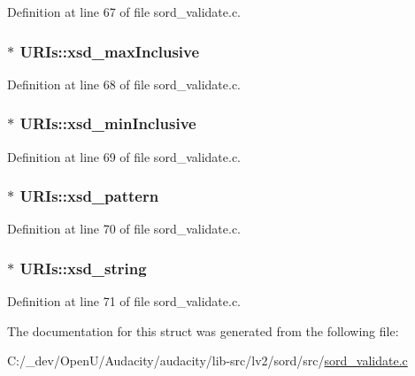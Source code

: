Definition at line 67 of file sord\+\_\+validate.\+c.

\subsubsection[{\texorpdfstring{xsd\+\_\+max\+Inclusive}{xsd_maxInclusive}}]{$\ast$ U\+R\+Is\+::xsd\+\_\+max\+Inclusive}\hypertarget{struct_u_r_is_a15c6968741c7ade2cfbd4b9ec06943be}{}\label{struct_u_r_is_a15c6968741c7ade2cfbd4b9ec06943be}


Definition at line 68 of file sord\+\_\+validate.\+c.

\subsubsection[{\texorpdfstring{xsd\+\_\+min\+Inclusive}{xsd_minInclusive}}]{$\ast$ U\+R\+Is\+::xsd\+\_\+min\+Inclusive}\hypertarget{struct_u_r_is_a34195a2268597cece115bfb485a16c25}{}\label{struct_u_r_is_a34195a2268597cece115bfb485a16c25}


Definition at line 69 of file sord\+\_\+validate.\+c.

\subsubsection[{\texorpdfstring{xsd\+\_\+pattern}{xsd_pattern}}]{$\ast$ U\+R\+Is\+::xsd\+\_\+pattern}\hypertarget{struct_u_r_is_a82b0bf38b6fef83c25f79e6684a43084}{}\label{struct_u_r_is_a82b0bf38b6fef83c25f79e6684a43084}


Definition at line 70 of file sord\+\_\+validate.\+c.

\subsubsection[{\texorpdfstring{xsd\+\_\+string}{xsd_string}}]{$\ast$ U\+R\+Is\+::xsd\+\_\+string}\hypertarget{struct_u_r_is_a7007b4ba2b000f91ae806958f3956aee}{}\label{struct_u_r_is_a7007b4ba2b000f91ae806958f3956aee}


Definition at line 71 of file sord\+\_\+validate.\+c.



The documentation for this struct was generated from the following file\+:\begin{DoxyCompactItemize}
\item 
C\+:/\+\_\+dev/\+Open\+U/\+Audacity/audacity/lib-\/src/lv2/sord/src/\hyperlink{sord__validate_8c}{sord\+\_\+validate.\+c}\end{DoxyCompactItemize}
